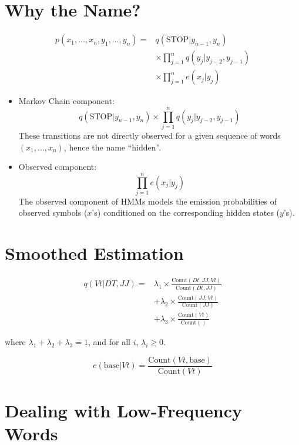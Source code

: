 \section{Why the Name?}
  \[
  \begin{aligned}
    p(x_1, \ldots, x_n, y_1, \ldots, y_n) = & q(\text{STOP}|y_{n-1}, y_n) \\
    & \times \prod_{j=1}^{n} q(y_j | y_{j-2}, y_{j-1}) \\
    & \times \prod_{j=1}^{n} e(x_j | y_j)
  \end{aligned}
  \]
  \begin{itemize}
    \item Markov Chain component:
    \[
    q(\text{STOP}|y_{n-1}, y_n)\times \prod_{j=1}^{n} q(y_j | y_{j-2}, y_{j-1})
    \]
These transitions are not directly observed for a given sequence of words $(x_1, \ldots, x_n)$, hence the name ``hidden''.

    \item Observed component:
    \[
    \prod_{j=1}^{n} e(x_j | y_j)
    \]
    The observed component of HMMs models the emission probabilities of observed symbols ($x$'s) conditioned on the corresponding hidden states ($y$'s).
  \end{itemize}



\section{Smoothed Estimation}

\[
\begin{aligned}
q(Vt | DT, JJ) = & \lambda_1 \times \frac{{\text{Count}(Dt, JJ, Vt)}}{{\text{Count}(Dt, JJ)}} \\
& + \lambda_2 \times \frac{{\text{Count}(JJ, Vt)}}{{\text{Count}(JJ)}} \\
& + \lambda_3 \times \frac{{\text{Count}(Vt)}}{{\text{Count}()}}
\end{aligned}
\]

where $\lambda_1 + \lambda_2 + \lambda_3 = 1$, and for all $i$, $\lambda_i \geq 0$.

\vspace{0.5cm}

\[
e(\text{base} | Vt) = \frac{{\text{Count}(Vt, \text{base})}}{{\text{Count}(Vt)}}
\]


\section{Dealing with Low-Frequency Words}

